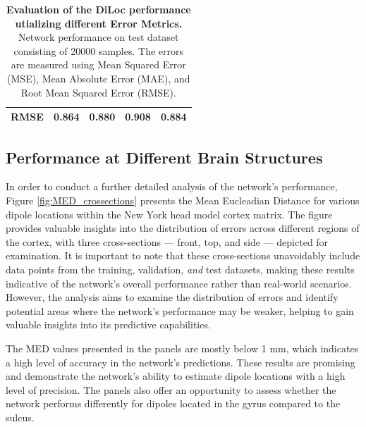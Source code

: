 \documentclass[a4paper, UKenglish, 11pt]{uiomaster}
\begin{document}
\begin{table}[!htb]
\begin{tabular}{l|cccc|}
\multicolumn{1}{|l|}{\cellcolor[HTML]{EFEFEF}RMSE} & \multicolumn{1}{c|}{0.864}                                                                                  & \multicolumn{1}{c|}{0.880}                                                                                   & \multicolumn{1}{c|}{0.908}                                                                                   & 0.884                                                                                                              \\ \hline
\end{tabular}
\caption{\textbf{Evaluation of the DiLoc performance utializing different Error Metrics.} \newline
Network performance on test dataset consisting of 20000 samples. The errors are measured using Mean Squared Error (MSE), Mean Absolute Error (MAE), and Root Mean Squared Error (RMSE).}
\label{table:error_simple_dipole}
\end{table}

\subsection{Performance at Different Brain Structures}

In order to conduct a further detailed analysis of the network's performance, Figure \ref{fig:MED_crossections} presents the Mean Eucleadian Distance for various dipole locations within the New York head model cortex matrix. The figure provides valuable insights into the distribution of errors across different regions of the cortex, with three cross-sections — front, top, and side — depicted for examination. It is important to note that these cross-sections unavoidably include data points from the training, validation, \emph{and} test datasets, making these results indicative of the network's overall performance rather than real-world scenarios. However, the analysis aims to examine the distribution of errors and identify potential areas where the network's performance may be weaker, helping to gain valuable insights into its predictive capabilities.

The MED values presented in the panels are mostly below 1 mm, which indicates a high level of accuracy in the network's predictions. These results are promising and demonstrate the network's ability to estimate dipole locations with a high level of precision. The panels also offer an opportunity to assess whether the network performs differently for dipoles located in the gyrus compared to the sulcus.
\end{document}
